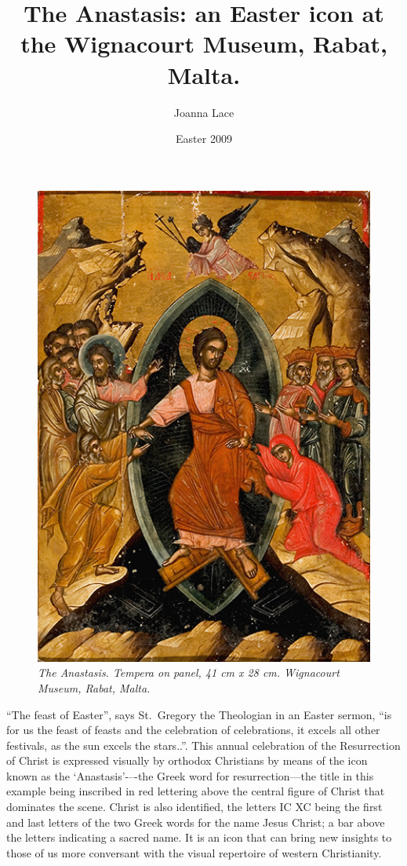 \documentclass[a4paper,12pt]{article}
\begin{document}
\title{The Anastasis: an Easter icon at the Wignacourt Museum, Rabat, Malta.}

\author{Joanna Lace} 

\date{Easter 2009} 

\maketitle 

\begin{figure}[htbp]
\centering
\includegraphics[width=12cm]{anastasis1.png}
\caption 
{\it The Anastasis.   Tempera on panel, 41 cm x 28 cm.  Wignacourt Museum,
Rabat, Malta.} 
\end{figure}
``The feast of Easter'', says St.~Gregory the Theologian in an Easter
sermon, ``is for us the feast of feasts and the celebration of
celebrations, it excels all other festivals, as the sun excels the
stars..''.  This annual celebration of the Resurrection of Christ is
expressed visually by orthodox Christians by means of the icon known
as the ‘Anastasis’-–-the Greek word for resurrection---the title in
this example being inscribed in red lettering above the central figure
of Christ that dominates the scene.  Christ is also identified, the
letters IC XC being the first and last letters of the two Greek words
for the name Jesus Christ; a bar above the letters indicating a sacred
name.  It is an icon that can bring new insights to those of us more
conversant with the visual repertoire of western Christianity.
\end{document}
